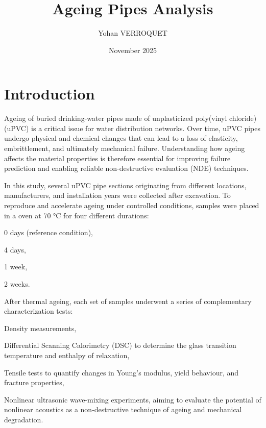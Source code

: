 \documentclass{article}
\title{Ageing Pipes Analysis}
\author{Yohan VERROQUET}
\date{November 2025}
\begin{document}
\maketitle
\newpage
\tableofcontents
\listoffigures           %
\listoftables            %
\newpage



\section{Introduction}
Ageing of buried drinking-water pipes made of unplasticized poly(vinyl chloride) (uPVC) is a critical issue for water distribution networks. Over time, uPVC pipes undergo physical and chemical changes that can lead to a loss of elasticity, embrittlement, and ultimately mechanical failure. Understanding how ageing affects the material properties is therefore essential for improving failure prediction and enabling reliable non-destructive evaluation (NDE) techniques.

In this study, several uPVC pipe sections originating from different locations, manufacturers, and installation years were collected after excavation. To reproduce and accelerate ageing under controlled conditions, samples were placed in a oven at 70 °C for four different durations:

0 days (reference condition),

4 days,

1 week,

2 weeks.

After thermal ageing, each set of samples underwent a series of complementary characterization tests:

Density measurements,

Differential Scanning Calorimetry (DSC) to determine the glass transition temperature and enthalpy of relaxation,

Tensile tests to quantify changes in Young’s modulus, yield behaviour, and fracture properties,

Nonlinear ultrasonic wave-mixing experiments, aiming to evaluate the potential of nonlinear acoustics as a non-destructive technique of ageing and mechanical degradation.
\end{document}
